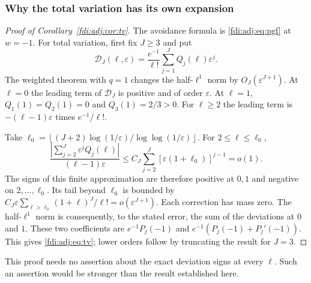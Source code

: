 \documentclass[11pt,letterpaper]{article}
\theoremstyle{remark}\newtheorem{remark}[theorem]{Remark}
\newcommand{\eps}{\varepsilon}\newcommand{\Pois}{\operatorname{Poisson}}
\newcommand{\floor}[1]{\left\lfloor #1\right\rfloor}
\begin{document}
\subsubsection*{Why the total variation has its own expansion}
\begin{proof}[Proof of Corollary~\ref{fdi:adj:cor:tv}]
The avoidance formula is \eqref{fdi:adj:eq:pgf} at $w=-1$. For total variation, first fix $J\ge3$ and put
\[
 \mathcal D_J(\ell,\eps)=\frac{e^{-1}}{\ell!}\sum_{j=1}^JQ_j(\ell)\eps^j.
\]
The weighted theorem with $q=1$ changes the half-$\ell^1$ norm by $O_J(\eps^{J+1})$. At $\ell=0$ the leading term of $\mathcal D_J$ is positive and of order $\eps$. At $\ell=1$, $Q_1(1)=Q_2(1)=0$ and $Q_3(1)=2/3>0$. For $\ell\ge2$ the leading term is $-(\ell-1)\eps$ times $e^{-1}/\ell!$.

Take $\ell_0=\floor{(J+2)\log(1/\eps)/\log\log(1/\eps)}$. For $2\le\ell\le \ell_0$,
\[
 \frac{\left|\sum_{j=2}^J\eps^jQ_j(\ell)\right|}{(\ell-1)\eps}
 \le C_J\sum_{j=2}^J[\eps(1+\ell_0)]^{j-1}=o(1).
\]
The signs of this finite approximation are therefore positive at $0,1$ and negative on $2,\ldots,\ell_0$. Its tail beyond $\ell_0$ is bounded by
$C_J\eps\sum_{\ell>\ell_0}(1+\ell)^J/\ell!=o(\eps^{J+1})$. Each correction has mass zero. The half-$\ell^1$ norm is consequently, to the stated error, the sum of the deviations at $0$ and $1$. These two coefficients are $e^{-1}P_j(-1)$ and $e^{-1}(P_j(-1)+P_j'(-1))$. This gives \eqref{fdi:adj:eq:tv}; lower orders follow by truncating the result for $J=3$.
\end{proof}
This proof needs no assertion about the exact deviation signs at every $\ell$. Such an assertion would be stronger than the result established here.
\end{document}
